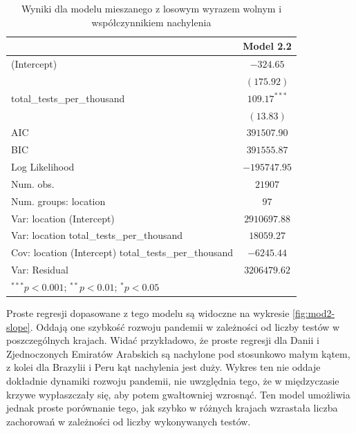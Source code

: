\documentclass[12pt]{mwbk}
\theoremstyle{plain}
\theoremstyle{definition}
\theoremstyle{definition}
\begin{document}
\begin{table}[!htbp]
\begin{center}
	\begin{tabular}{l c}
		\hline
		& Model 2.2 \\
		\hline
		(Intercept)                                           & $-324.65$      \\
		& $(175.92)$     \\
		total\_tests\_per\_thousand                           & $109.17^{***}$ \\
		& $(13.83)$      \\
		\hline
		AIC                                                   & $391507.90$    \\
		BIC                                                   & $391555.87$    \\
		Log Likelihood                                        & $-195747.95$   \\
		Num. obs.                                             & $21907$        \\
		Num. groups: location                                 & $97$           \\
		Var: location (Intercept)                             & $2910697.88$   \\
		Var: location total\_tests\_per\_thousand             & $18059.27$     \\
		Cov: location (Intercept) total\_tests\_per\_thousand & $-6245.44$     \\
		Var: Residual                                         & $3206479.62$   \\
		\hline
		\multicolumn{2}{l}{\scriptsize{$^{***}p<0.001$; $^{**}p<0.01$; $^{*}p<0.05$}}
	\end{tabular}
	\caption{Wyniki dla modelu mieszanego z losowym wyrazem wolnym i współczynnikiem nachylenia}
	\label{table:mod2-1}
\end{center}
\end{table}

Proste regresji dopasowane z tego modelu są widoczne na wykresie \ref{fig:mod2-slope}. Oddają one szybkość rozwoju pandemii w zależności od liczby testów w poszczególnych krajach. Widać przykładowo, że proste regresji dla Danii i Zjednoczonych Emiratów Arabskich są nachylone pod stosunkowo małym kątem, z kolei dla Brazylii i Peru kąt nachylenia jest duży. Wykres ten nie oddaje dokładnie dynamiki rozwoju pandemii, nie uwzględnia tego, że w międzyczasie krzywe wypłaszczały się, aby potem gwałtowniej wzrosnąć. Ten model umożliwia jednak proste porównanie tego, jak szybko w różnych krajach wzrastała liczba zachorowań w zależności od liczby wykonywanych testów.
\end{document}
